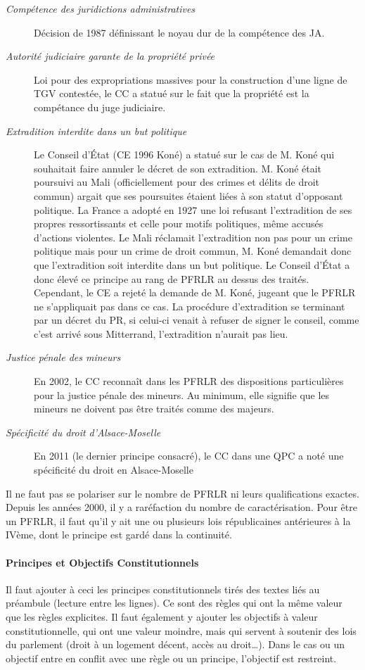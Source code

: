 \documentclass[math]{cours}
\begin{document}
\begin{description}
	\item[\emph{Compétence des juridictions administratives}] Décision de 1987 définissant le noyau dur de la compétence des JA.
	\item[\emph{Autorité judiciaire garante de la propriété privée}] Loi pour des expropriations massives pour la construction d'une ligne de TGV contestée, le CC a statué sur le fait que la propriété est la compétance du juge judiciaire.
	\item[\emph{Extradition interdite dans un but politique}] Le Conseil d'État (CE 1996 Koné) a statué sur le cas de M. Koné qui souhaitait faire annuler le décret de son extradition.
		M. Koné était poursuivi au Mali (officiellement pour des crimes et délits de droit commun) argait que ses poursuites étaient liées à son statut d'opposant politique.
		La France a adopté en 1927 une loi refusant l'extradition de ses propres ressortissants et celle pour motifs politiques, même accusés d'actions violentes.
		Le Mali réclamait l'extradition non pas pour un crime politique mais pour un crime de droit commun, M. Koné demandait donc que l'extradition soit interdite dans un but politique.
		Le Conseil d'État a donc élevé ce principe au rang de PFRLR au dessus des traités.
		Cependant, le CE a rejeté la demande de M. Koné, jugeant que le PFRLR ne s'appliquait pas dans ce cas.
		La procédure d'extradition se terminant par un décret du PR, si celui-ci venait à refuser de signer le conseil, comme c'est arrivé sous Mitterrand, l'extradition n'aurait pas lieu.
	\item[\emph{Justice pénale des mineurs}] En 2002, le CC reconnaît dans les PFRLR des dispositions particulières pour la justice pénale des mineurs.
		Au minimum, elle signifie que les mineurs ne doivent pas être traités comme des majeurs.
	\item[\emph{Spécificité du droit d'Alsace-Moselle}] En 2011 (le dernier principe consacré), le CC dans une QPC a noté une spécificité du droit en Alsace-Moselle
\end{description}
Il ne faut pas se polariser sur le nombre de PFRLR ni leurs qualifications exactes.
Depuis les années 2000, il y a raréfaction du nombre de caractérisation.
Pour être un PFRLR, il faut qu'il y ait une ou plusieurs lois républicaines antérieures à la IVème, dont le principe est gardé dans la continuité.

\paragraph{Principes et Objectifs Constitutionnels}
Il faut ajouter à ceci les principes constitutionnels tirés des textes liés au préambule (lecture entre les lignes).
Ce sont des règles qui ont la même valeur que les règles explicites.
Il faut également y ajouter les objectifs à valeur constitutionnelle, qui ont une valeur moindre, mais qui servent à soutenir des lois du parlement (droit à un logement décent, accès au droit\ldots).
Dans le cas ou un objectif entre en conflit avec une règle ou un principe, l'objectif est restreint.
\end{document}
